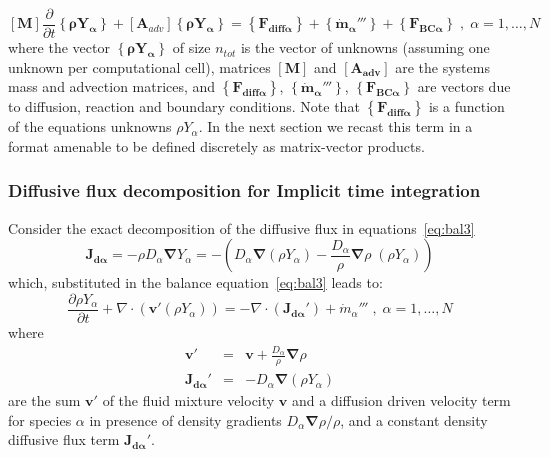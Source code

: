 \documentclass[12pt]{article}
\begin{document}
%
\begin{equation}
\left[ \mathbf{M} \right] \frac{\partial}{\partial t} \left\{ \mathbf{\rho Y_\alpha} \right\} + \left[ \mathbf{A}_{adv}  \right] \left\{ \mathbf{\rho Y_\alpha} \right\} = \left\{ \mathbf{F_{diff \alpha}} \right\} + \left\{  \mathbf{\dot{m}_\alpha'''} \right\} +  \left\{ \mathbf{F_{BC \alpha}} \right\} \; , \; \alpha=1,\dots,N \label{eq:discbal3}
\end{equation}
%
where the vector $\left\{ \mathbf{\rho Y_\alpha} \right\}$ of size $n_{tot}$ is the vector of unknowns (assuming one unknown per computational cell), matrices $\left[ \mathbf{M} \right]$ and $ \left[ \mathbf{A_{adv}}  \right]$ are the systems mass and advection matrices, and $\left\{ \mathbf{F_{diff \alpha}} \right\}$, $\left\{  \mathbf{\dot{m}_\alpha'''} \right\}$, $\left\{ \mathbf{F_{BC \alpha}} \right\}$ are vectors due to diffusion, reaction and boundary conditions. Note that $\left\{ \mathbf{F_{diff \alpha}} \right\}$ is a function of the equations unknowns $\rho Y_\alpha$. In the next section we recast this term in a format amenable to be defined discretely as matrix-vector products.


\subsubsection*{Diffusive flux decomposition for Implicit time integration}

Consider the exact decomposition of the diffusive flux in equations~\eqref{eq:bal3}
%
\begin{equation}
   \mathbf{J_{d \alpha}} = - \rho D_\alpha \boldsymbol{\nabla} Y_\alpha =  - \left( D_\alpha \boldsymbol{\nabla} ( \rho Y_\alpha)
   - \frac{D_\alpha}{\rho} \boldsymbol{\nabla} \rho \; ( \rho Y_\alpha) \right) \label{eq:expdfl2}
\end{equation}
%
which, substituted in the balance equation~\eqref{eq:bal3} leads to:
%
\begin{equation}
 \frac{\partial \rho Y_\alpha}{ \partial t} + \nabla \cdot \left(  \mathbf{v}' (\rho Y_\alpha)   \right) = - \nabla \cdot \left(  \mathbf{J_{d \alpha}'} \right) + \dot{m}_\alpha''' \; , \; \alpha=1,\dots,N \label{eq:bal4}
\end{equation}
%
where
%
\begin{eqnarray}
  \mathbf{v}' &=& \mathbf{v} + \frac{D_\alpha}{\rho} \boldsymbol{\nabla} \rho  \label{eq:vprime} \\
   \mathbf{J_{d \alpha}'} &=& -D_\alpha \boldsymbol{\nabla}  (\rho Y_\alpha )  \label{eq:jdaprime}
\end{eqnarray}
%
are the sum $\mathbf{v}'$ of the fluid mixture velocity $\mathbf{v}$ and a diffusion driven velocity term for species $\alpha$ in presence of density gradients $D_\alpha \boldsymbol{\nabla} \rho / \rho $, and a constant density diffusive flux term $\mathbf{J_{d \alpha}'}$.
\end{document}

